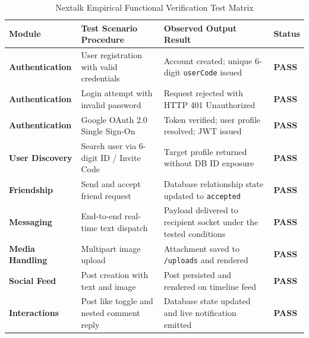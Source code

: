 \documentclass[12pt, a4paper]{article}
\begin{document}
\begin{table}[htbp]
\centering
\small
\renewcommand{\arraystretch}{1.25}
\setlength{\tabcolsep}{6pt}

\caption{Nextalk Empirical Functional Verification Test Matrix}
\label{tab:results_matrix}

\begin{tabularx}{\textwidth}{
    >{\raggedright\arraybackslash}p{3.0cm}
    >{\raggedright\arraybackslash}X
    >{\raggedright\arraybackslash}X
    >{\centering\arraybackslash}p{1.4cm}
}
\toprule

\textbf{Module} &
\textbf{Test Scenario Procedure} &
\textbf{Observed Output Result} &
\textbf{Status} \\

\midrule

\textbf{Authentication} &
User registration with valid credentials &
Account created; unique 6-digit \texttt{userCode} issued &
\textbf{PASS} \\

\textbf{Authentication} &
Login attempt with invalid password &
Request rejected with HTTP 401 Unauthorized &
\textbf{PASS} \\

\textbf{Authentication} &
Google OAuth 2.0 Single Sign-On &
Token verified; user profile resolved; JWT issued &
\textbf{PASS} \\

\textbf{User Discovery} &
Search user via 6-digit ID / Invite Code &
Target profile returned without DB ID exposure &
\textbf{PASS} \\

\textbf{Friendship} &
Send and accept friend request &
Database relationship state updated to \texttt{accepted} &
\textbf{PASS} \\

\textbf{Messaging} &
End-to-end real-time text dispatch &
Payload delivered to recipient socket under the tested conditions &
\textbf{PASS} \\

\textbf{Media Handling} &
Multipart image upload &
Attachment saved to \texttt{/uploads} and rendered &
\textbf{PASS} \\

\textbf{Social Feed} &
Post creation with text and image &
Post persisted and rendered on timeline feed &
\textbf{PASS} \\

\textbf{Interactions} &
Post like toggle and nested comment reply &
Database state updated and live notification emitted &
\textbf{PASS} \\

\bottomrule
\end{tabularx}

\end{table}
\end{document}
